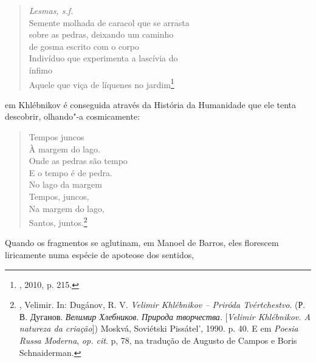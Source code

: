 \begin{verse}
\emph{Lesmas, s.f.}\\
Semente molhada de caracol que se arrasta \\
sobre as pedras, deixando um caminho \\
de gosma escrito com o corpo \\
Indivíduo que experimenta a lascívia do \\
ínfimo \\
Aquele que viça de líquenes no jardim\footnote{, 2010, p. 215.}
\end{verse}

em Khlébnikov é conseguida através da História da Humanidade que ele
tenta descobrir, olhando"-a cosmicamente:

\begin{verse}
Tempos juncos \\
À margem do lago. \\
Onde as pedras são tempo \\
E o tempo é de pedra. \\
No lago da margem \\
Tempos, juncos, \\
Na margem do lago, \\
Santos, juntos.\footnote{, Velimir. In: Dugánov, R. V.
  \emph{Velimir Khlébnikov -- Priróda Tvértchestvo}. (Р. В. Дуганов.
  \emph{Велимир Хлебников}. \emph{Природа творчества}. [\emph{Velimir
  Khlébnikov. A natureza da criação}]) Moskvá, Soviétski Pissátel',
  1990. p. 40. E em \emph{Poesia Russa Moderna}, \emph{op. cit}. p, 78, na
  tradução de Augusto de Campos e Boris Schnaiderman.}
\end{verse}

Quando os fragmentos se aglutinam, em Manoel de Barros, eles florescem
liricamente numa espécie de apoteose dos sentidos,

